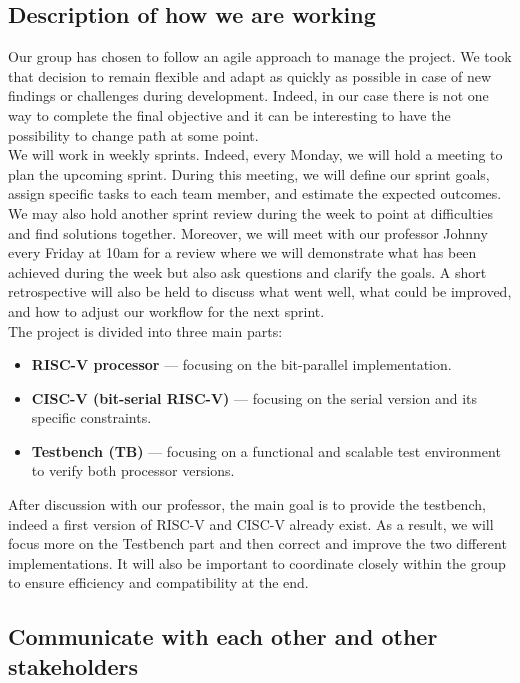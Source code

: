 \documentclass[10pt]{article}
\begin{document}
\subsection{Description of how we are working}

Our group has chosen to follow an agile approach to manage the project. We took that decision to remain flexible and adapt as quickly as possible in case of new findings or challenges during development. Indeed, in our case there is not one way to complete the final objective and it can be interesting to have the possibility to change path at some point.\\
We will work in weekly sprints. Indeed, every Monday, we will hold a meeting to plan the upcoming sprint. During this meeting, we will define our sprint goals, assign specific tasks to each team member, and estimate the expected outcomes.
We may also hold another sprint review during the week to point at difficulties and find solutions together.
Moreover, we will meet with our professor Johnny every Friday at 10am for a review where we will demonstrate what has been achieved during the week but also ask questions and clarify the goals.
A short retrospective will also be held to discuss what went well, what could be improved, and how to adjust our workflow for the next sprint.\\
The project is divided into three main parts:

\begin{itemize}
  \item \textbf{RISC-V processor} — focusing on the bit-parallel implementation.
  \item \textbf{CISC-V (bit-serial RISC-V)} — focusing on the serial version and its specific constraints.
  \item \textbf{Testbench (TB)} — focusing on a functional and scalable test environment to verify both processor versions.
\end{itemize}

After discussion with our professor, the main goal is to provide the testbench, indeed a first version of RISC-V and CISC-V already exist. As a result, we will focus more on the Testbench part and then correct and improve the two different implementations. It will also be important to coordinate closely within the group to ensure efficiency and compatibility at the end.

\subsection{Communicate with each other and other stakeholders}
\end{document}
